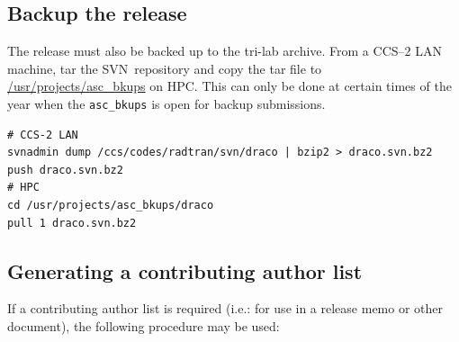 \documentclass[note]{ResearchNote_pdf}
\newcommand{\svn}{\textsf{SVN}}
\begin{document}

\subsection{Backup the release}
\label{sec:backup_rel}


The release must also be backed up to the tri-lab archive.  From a
CCS--2 LAN machine, tar the \svn\ repository and copy the tar file to
\url{/usr/projects/asc\_bkups} on HPC.  This can only be done at
certain times of the year when the \texttt{asc\_bkups} is open for
backup submissions. 
\begin{lstlisting}[basicstyle=\footnotesize, xleftmargin=1.0in, 
  xrightmargin=1.00in]
# CCS-2 LAN
svnadmin dump /ccs/codes/radtran/svn/draco | bzip2 > draco.svn.bz2
push draco.svn.bz2
# HPC
cd /usr/projects/asc_bkups/draco
pull 1 draco.svn.bz2
\end{lstlisting}


\subsection{Generating a contributing author list}
\label{sec:author_list}

If a contributing author list is required (i.e.: for use in a release
memo or other document), the following procedure may be used:
\end{document}
